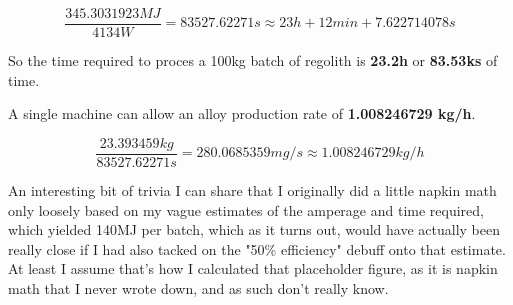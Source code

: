 \documentclass[a4paper]{article}
\begin{document}
    $$ \frac{345.3031923 MJ}{4134W} = 83527.62271 s \approx 23 h + 12 min + 7.622714078 s
    $$
    
    So the time required to proces a 100kg batch of regolith is \textbf{23.2h} or \textbf{83.53ks} of time.
    
    \bigskip
    
    \noindent A single machine can allow an alloy production rate of \textbf{1.008246729 kg/h}.
    
    $$\frac{23.393459 kg}{83527.62271 s} = 280.0685359 mg/s \approx 1.008246729 kg/h$$
    
    \vfill
    
    An interesting bit of trivia I can share that I originally did a little napkin math only loosely based on my vague estimates of the amperage and time required, which yielded 140MJ per batch, which as it turns out, %
    would have actually been really close if I had also tacked on the "50\% efficiency" debuff onto that estimate.
    At least I assume that's how I calculated that placeholder figure, as it is napkin math that I never wrote down, and as such don't really know.
	
\end{document}
